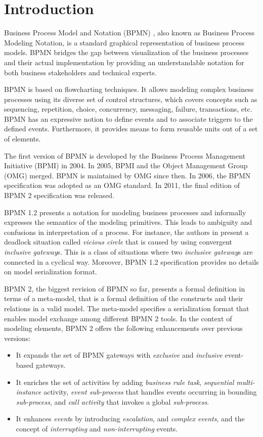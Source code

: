 \section{Introduction}
Business Process Model and Notation (BPMN) \cite{BPMN20}, also known as Business Process Modeling Notation, is a standard graphical representation of business process models. BPMN bridges the gap between
visualization of the business processes and their actual implementation by providing an understandable notation for both business stakeholders and technical experts.

BPMN is based on flowcharting techniques. It allows modeling complex business processes using its diverse set of control structures, which covers concepts such as sequencing, repetition, choice, concurrency, messaging, failure, transactions, etc. BPMN has an expressive notion to define events and to associate triggers to the defined events. Furthermore, it provides means to form reusable units out of a set of elements. 

The first version of BPMN is developed by the Business Process Management Initiative (BPMI) in 2004. In 2005, BPMI and the Object Management Group (OMG) merged. BPMN is maintained by OMG since then. In 2006, the BPMN specification was adopted as an OMG standard. In 2011, the final edition of BPMN 2 specification was released.

BPMN 1.2 presents a notation for modeling business processes and informally expresses the semantics of the modeling primitives. This leads to ambiguity and confusions in interpretation of a process. For instance, the authors in \cite{viciouscirc} present a deadlock situation called \emph{vicious circle} that is caused by using convergent \emph{inclusive gateway}s. This is a class of situations where two \emph{inclusive gateway}s are connected 
 in a cyclical way. %
 Moreover, BPMN 1.2 specification provides no details on model serialization format.

BPMN 2, the biggest revision of BPMN so far, presents a formal definition in terms of a meta-model, that is a formal definition of the constructs and their relations in a valid model. The meta-model specifies a serialization format that enables model exchange among different BPMN 2 tools. 
In the context of modeling elements, BPMN 2 offers the following enhancements over previous versions:

\begin{itemize}
\item It expands the set of BPMN gateways with \emph{exclusive} and \emph{inclusive} event-based gateways.
\item It enriches the set of activities by adding \emph{business rule task}, \emph{sequential multi-instance} activity, \emph{event sub-process} that handles events occurring in bounding \emph{sub-process}, and
\emph{call activity} that invokes a global \emph{sub-process}.
\item It enhances \emph{event}s by introducing \emph{escalation}, and \emph{complex events}, and the concept of \emph{interrupting} and \emph{non-interrupting} events.
\end{itemize}

